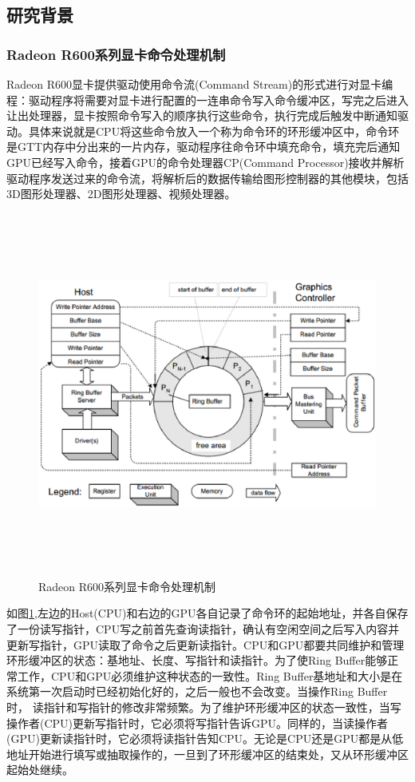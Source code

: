 
\subsection{研究背景}

\subsubsection{Radeon R600系列显卡命令处理机制}
Radeon R600显卡提供驱动使用命令流(Command Stream)的形式进行对显卡编程：驱动程序将需要对显卡进行配置的一连串命令写入命令缓冲区，写完之后进入让出处理器，显卡按照命令写入的顺序执行这些命令，执行完成后触发中断通知驱动。具体来说就是CPU将这些命令放入一个称为命令环的环形缓冲区中，命令环是GTT内存中分出来的一片内存，驱动程序往命令环中填充命令，填充完后通知GPU已经写入命令，接着GPU的命令处理器CP(Command Processor)接收并解析驱动程序发送过来的命令流，将解析后的数据传输给图形控制器的其他模块，包括3D图形处理器、2D图形处理器、视频处理器。

\begin{figure}[H] 
  \centering
  \includegraphics[width=16cm,height=12cm]{figures/chap03/CommandBuffer}
  \caption{Radeon R600系列显卡命令处理机制}
  \label{fig:CommandBuffer}
\end{figure}

如图\ref{fig:CommandBuffer},左边的Host(CPU)和右边的GPU各自记录了命令环的起始地址，并各自保存了一份读写指针，CPU写之前首先查询读指针，确认有空闲空间之后写入内容并更新写指针，GPU读取了命令之后更新读指针。CPU和GPU都要共同维护和管理环形缓冲区的状态：基地址、长度、写指针和读指针。为了使Ring Buffer能够正常工作，CPU和GPU必须维护这种状态的一致性。Ring Buffer基地址和大小是在系统第一次启动时已经初始化好的，之后一般也不会改变。当操作Ring Buffer时， 读指针和写指针的修改非常频繁。为了维护环形缓冲区的状态一致性，当写操作者(CPU)更新写指针时，它必须将写指针告诉GPU。同样的，当读操作者(GPU)更新读指针时，它必须将读指针告知CPU。无论是CPU还是GPU都是从低地址开始进行填写或抽取操作的，一旦到了环形缓冲区的结束处，又从环形缓冲区起始处继续\cite{Radeon-Manual}。　　

